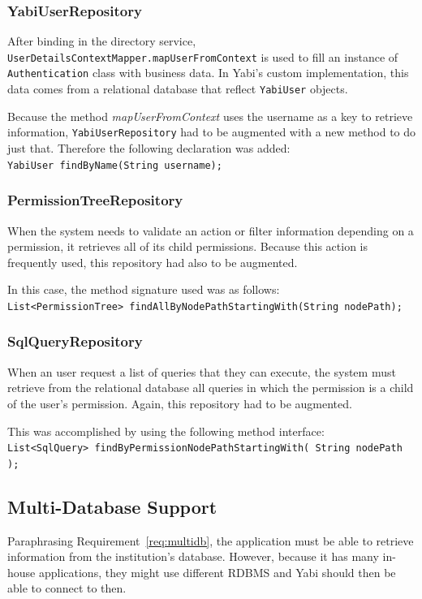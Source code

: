\subsubsection{YabiUserRepository}
After binding in the directory service, \texttt{UserDetailsContextMapper.mapUserFromContext} is used to fill an instance of \texttt{Authentication} class with business data. In \gls{Yabi}'s custom implementation, this data comes from a relational database that reflect \texttt{YabiUser} objects.

Because the method \textit{mapUserFromContext} uses the username as a key to retrieve information, \texttt{YabiUserRepository} had to be augmented with a new method to do just that. Therefore the following declaration was added:\\
\texttt{YabiUser findByName(String username);}

\subsubsection{PermissionTreeRepository}
When the system needs to validate an action or filter information depending on a permission, it retrieves all of its child permissions. Because this action is frequently used, this repository had also to be augmented.

In this case, the method signature used was as follows:\\
\texttt{List<PermissionTree> findAllByNodePathStartingWith(String~nodePath);}

\subsubsection{SqlQueryRepository}
When an user request a list of queries that they can execute, the system must retrieve from the relational database all queries in which the permission is a child of the user's permission. Again, this repository had to be augmented.

This was accomplished by using the following method interface:\\
\texttt{List<SqlQuery> findByPermissionNodePathStartingWith( String~nodePath );}

\subsection{Multi-Database Support}
Paraphrasing Requirement~\ref{req:multidb}, the application must be able to retrieve information from the institution's database. However, because it has many in-house applications, they might use different \gls{RDBMS} and \gls{Yabi} should then be able to connect to then.

